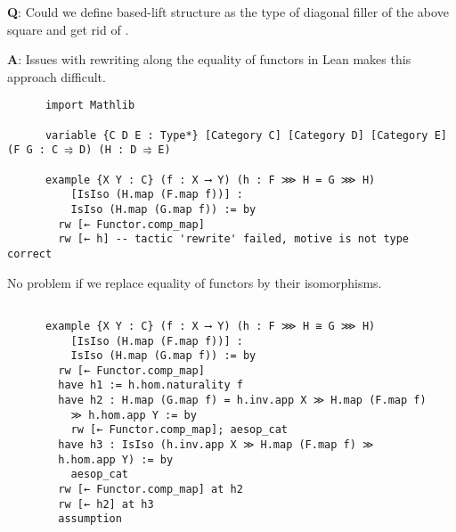 \documentclass[landscape]{slides}
\newcommand{\lean}[1]{{\color{red}{\texttt{#1}}}}
\begin{document}
\begin{slide}
    \restoregeometry 

    \textbf{Q}: Could we define based-lift structure as the type of diagonal filler of the above square and get rid of \lean{eqToHom}. 
    
    \textbf{A}: Issues with rewriting along the equality of functors in Lean makes this approach difficult. 
    
    \par{}\baselineskip
    
    \begin{lstlisting}
      import Mathlib
    
      variable {C D E : Type*} [Category C] [Category D] [Category E] (F G : C ⥤ D) (H : D ⥤ E)
    
      example {X Y : C} (f : X ⟶ Y) (h : F ⋙ H = G ⋙ H) 
          [IsIso (H.map (F.map f))] :
          IsIso (H.map (G.map f)) := by
        rw [← Functor.comp_map]
        rw [← h] -- tactic 'rewrite' failed, motive is not type correct  

    \end{lstlisting}

\end{slide}  
  
  
\begin{slide}
  
    No problem if we replace equality of functors by their isomorphisms. 


    \begin{lstlisting}
   
      example {X Y : C} (f : X ⟶ Y) (h : F ⋙ H ≅ G ⋙ H) 
          [IsIso (H.map (F.map f))] :
          IsIso (H.map (G.map f)) := by
        rw [← Functor.comp_map]
        have h1 := h.hom.naturality f
        have h2 : H.map (G.map f) = h.inv.app X ≫ H.map (F.map f) 
          ≫ h.hom.app Y := by
          rw [← Functor.comp_map]; aesop_cat
        have h3 : IsIso (h.inv.app X ≫ H.map (F.map f) ≫ 
        h.hom.app Y) := by
          aesop_cat
        rw [← Functor.comp_map] at h2
        rw [← h2] at h3
        assumption

    \end{lstlisting}
  
\end{slide}  
 
\end{document}
